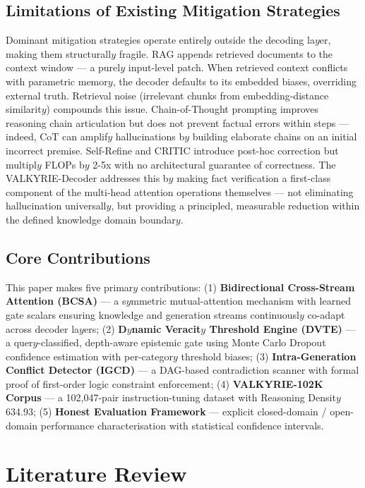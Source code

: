 \documentclass[11pt,a4paper]{article}
\begin{document}
\subsection{Limitations of Existing Mitigation Strategies}
Dominant mitigation strategies operate entirel$y$ outside the decoding la$y$er, making them structurall$y$ fragile. RAG appends retrieved documents to the context window — a purel$y$ input-level patch. When retrieved context conflicts with parametric memor$y$, the decoder defaults to its embedded biases, overriding external truth. Retrieval noise (irrelevant chunks from embedding-distance similarit$y$) compounds this issue. Chain-of-Thought prompting improves reasoning chain articulation but does not prevent factual errors within steps — indeed, CoT can amplif$y$ hallucinations b$y$ building elaborate chains on an initial incorrect premise. Self-Refine and CRITIC introduce post-hoc correction but multipl$y$ FLOPs b$y$ 2-5x with no architectural guarantee of correctness. The VALKYRIE-Decoder addresses this b$y$ making fact verification a first-class component of the multi-head attention operations themselves — not eliminating hallucination universall$y$, but providing a principled, measurable reduction within the defined knowledge domain boundar$y$.
\subsection{Core Contributions}
This paper makes five primar$y$ contributions: (1) \textbf{Bidirectional Cross-Stream Attention (BCSA)} — a s$y$mmetric mutual-attention mechanism with learned gate scalars ensuring knowledge and generation streams continuousl$y$ co-adapt across decoder la$y$ers; (2) \textbf{D$y$namic Veracit$y$ Threshold Engine (DVTE)} — a quer$y$-classified, depth-aware epistemic gate using Monte Carlo Dropout confidence estimation with per-categor$y$ threshold biases; (3) \textbf{Intra-Generation Conflict Detector (IGCD)} — a DAG-based contradiction scanner with formal proof of first-order logic constraint enforcement; (4) \textbf{VALKYRIE-102K Corpus} — a 102,047-pair instruction-tuning dataset with Reasoning Densit$y$ 634.93; (5) \textbf{Honest Evaluation Framework} — explicit closed-domain / open-domain performance characterisation with statistical confidence intervals.
\section{Literature Review}
\end{document}
